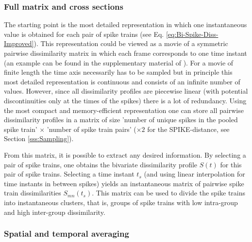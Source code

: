 \documentclass[10pt,twocolumn]{elsart5p}
\begin{document}
%

\subsubsection{\label{sss:Full-matrix-and-cross-sections} Full matrix and cross sections}

The starting point is the most detailed representation in which one instantaneous value is obtained for each pair of spike trains (see Eq. \ref{eq:Bi-Spike-Diss-Improved}). This representation could be viewed as a movie of a symmetric pairwise dissimilarity matrix in which each frame corresponds to one time instant (an example can be found in the supplementary material of \citep{Kreuz13}). For a movie of finite length the time axis necessarily has to be sampled but in principle this most detailed representation is continuous and consists of an infinite number of values. However, since all dissimilarity profiles are piecewise linear (with potential discontinuities only at the times of the spikes) there is a lot of redundancy. Using the most compact and memory-efficient representation one can store all pairwise dissimilarity profiles in a matrix of size 'number of unique spikes in the pooled spike train' $\times$ 'number of spike train pairs' ($\times 2$ for the SPIKE-distance, see Section \ref{sss:Sampling}).

From this matrix, it is possible to extract any desired information. By selecting a pair of spike trains, one obtains the bivariate dissimilarity profile $S (t)$ for this pair of spike trains. Selecting a time instant $t_s$ (and using linear interpolation for time instants in between spikes) yields an instantaneous matrix of pairwise spike train dissimilarities $S_{mn}(t_s)$. This matrix can be used to divide the spike trains into instantaneous clusters, that is, groups of spike trains with low intra-group and high inter-group dissimilarity.

\subsubsection{\label{sss:Spatial-and-temporal-Averaging} Spatial and temporal averaging}
\end{document}
